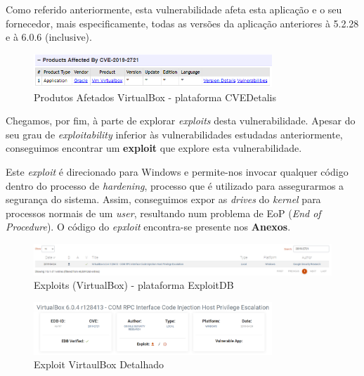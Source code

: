 \documentclass[11t]{article}
\begin{document}
\vspace{0.3cm}

Como referido anteriormente, esta vulnerabilidade afeta esta aplicação e o seu fornecedor, mais especificamente, todas as versões da aplicação anteriores à 5.2.28 e à 6.0.6 (inclusive).

\begin{figure}[H]
    \centering
    \includegraphics[width=0.8\textwidth]{images/produtosAfetadosVirtualBox.png}
    \caption{Produtos Afetados VirtualBox - plataforma CVEDetalis}
\end{figure}

\vspace{0.3cm}

Chegamos, por fim, à parte de explorar \textit{exploits} desta vulnerabilidade. Apesar do seu grau de \textit{exploitability} inferior às vulnerabilidades estudadas anteriormente, conseguimos encontrar um \textbf{exploit} que explore esta vulnerabilidade. 

\vspace{0.1cm}

Este \textit{exploit} é direcionado para Windows e permite-nos invocar qualquer código dentro do processo de \textit{hardening}, processo que é utilizado para assegurarmos a segurança do sistema. Assim, conseguimos expor as \textit{drives} do \textit{kernel} para processos normais de um \textit{user}, resultando num problema de EoP (\textit{End of Procedure}). O código do \textit{epxloit} encontra-se presente nos \textbf{Anexos}.

\begin{figure}[H]
    \centering
    \includegraphics[width=1\textwidth]{images/exploitVirtualBox.png}
    \caption{Exploits (VirtualBox) - plataforma ExploitDB}
\end{figure}

\begin{figure}[H]
    \centering
    \includegraphics[width=0.8\textwidth]{images/exploitVirtualBoxDetalhado.png}
    \caption{Exploit VirtaulBox Detalhado}
\end{figure}
\end{document}
